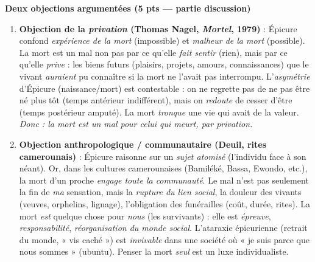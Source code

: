 \documentclass[11pt]{article}
\begin{document}
\begin{corrige}
\textbf{Deux objections argumentées (5 pts — partie discussion)}\par
\begin{enumerate}
\item \textbf{Objection de la \emph{privation} (Thomas Nagel, \emph{Mortel}, 1979)} : Épicure confond \emph{expérience de la mort} (impossible) et \emph{malheur de la mort} (possible). La mort est un mal non pas par ce qu'elle \emph{fait sentir} (rien), mais par ce qu'elle \emph{prive} : les biens futurs (plaisirs, projets, amours, connaissances) que le vivant \emph{auraient} pu connaître si la mort ne l'avait pas interrompu. L'\emph{asymétrie} d'Épicure (naissance/mort) est contestable : on ne regrette pas de ne pas être né plus tôt (temps antérieur indifférent), mais on \emph{redoute} de cesser d'être (temps postérieur amputé). La mort \emph{tronque} une vie qui avait de la valeur. \emph{Donc : la mort est un mal pour celui qui meurt, par privation.}
\item \textbf{Objection anthropologique / communautaire (Deuil, rites camerounais)} : Épicure raisonne sur un \emph{sujet atomisé} (l'individu face à son néant). Or, dans les cultures camerounaises (Bamiléké, Bassa, Ewondo, etc.), la mort d'un proche \emph{engage toute la communauté}. Le mal n'est pas seulement la fin de \emph{ma} sensation, mais la \emph{rupture du lien social}, la douleur des vivants (veuves, orphelins, lignage), l'obligation des funérailles (coût, durée, rites). La mort \emph{est} quelque chose pour \emph{nous} (les survivants) : elle est \emph{épreuve}, \emph{responsabilité}, \emph{réorganisation du monde social}. L'ataraxie épicurienne (retrait du monde, « vis caché ») est \emph{invivable} dans une société où « je suis parce que nous sommes » (ubuntu). Penser la mort \emph{seul} est un luxe individualiste.
\end{enumerate}


\end{corrige}
\end{document}
